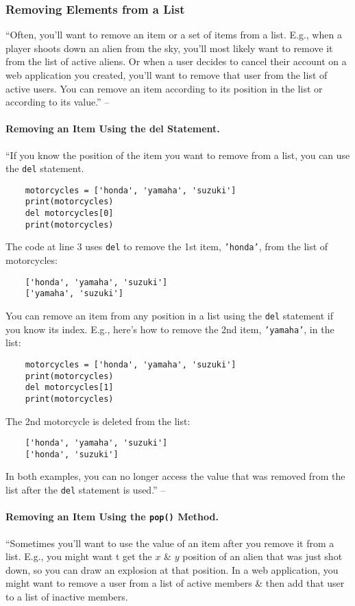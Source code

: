 \documentclass[oneside]{book}
\numberwithin{equation}{section}
\begin{document}
\subsubsection{Removing Elements from a List}
``Often, you'll want to remove an item or a set of items from a list. E.g., when a player shoots down an alien from the sky, you'll most likely want to remove it from the list of active aliens. Or when a user decides to cancel their account on a web application you created, you'll want to remove that user from the list of active users. You can remove an item according to its position in the list or according to its value.'' -- \cite[pp. 38--39]{Matthes2019}

\paragraph{Removing an Item Using the del Statement.} ``If you know the position of the item you want to remove from a list, you can use the \texttt{del} statement.
\begin{verbatim}
	motorcycles = ['honda', 'yamaha', 'suzuki']
	print(motorcycles)
	del motorcycles[0]
	print(motorcycles)
\end{verbatim}
The code at line 3 uses \texttt{del} to remove the 1st item, \texttt{'honda'}, from the list of motorcycles:
\begin{verbatim}
	['honda', 'yamaha', 'suzuki']
	['yamaha', 'suzuki']
\end{verbatim}
You can remove an item from any position in a list using the \texttt{del} statement if you know its index. E.g., here's how to remove the 2nd item, \texttt{'yamaha'}, in the list:
\begin{verbatim}
	motorcycles = ['honda', 'yamaha', 'suzuki']
	print(motorcycles)
	del motorcycles[1]
	print(motorcycles)
\end{verbatim}
The 2nd motorcycle is deleted from the list:
\begin{verbatim}
	['honda', 'yamaha', 'suzuki']
	['honda', 'suzuki']
\end{verbatim}
In both examples, you can no longer access the value that was removed from the list after the \texttt{del} statement is used.'' -- \cite[p. 39]{Matthes2019}

\paragraph{Removing an Item Using the \texttt{pop()} Method.} ``Sometimes you'll want to use the value of an item after you remove it from a list. E.g., you might want t get the $x$ \& $y$ position of an alien that was just shot down, so you can draw an explosion at that position. In a web application, you might want to remove a user from a list of active members \& then add that user to a list of inactive members.
\end{document}
